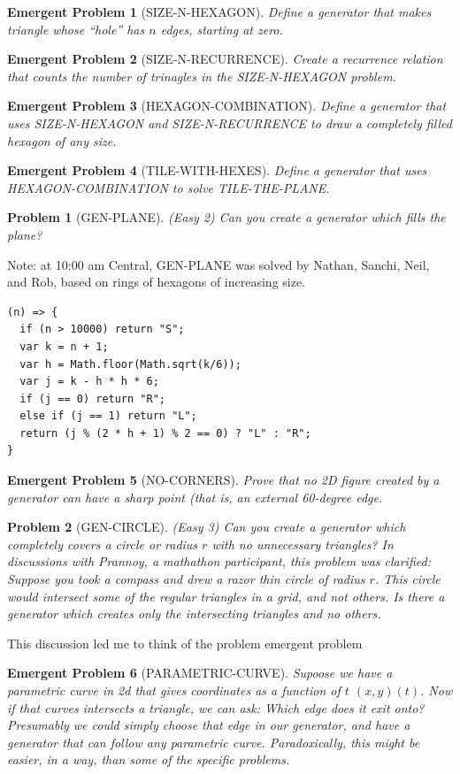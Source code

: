 \documentclass[11pt]{article}
\newtheorem{problem}{Problem}
\newtheorem{eproblem}{Emergent Problem}
\begin{document}
\begin{eproblem}[SIZE-N-HEXAGON]
  Define a generator that makes triangle whose ``hole'' has $n$ edges, starting at zero.
\end{eproblem}
\begin{eproblem}[SIZE-N-RECURRENCE]
  Create a recurrence relation that counts the number of trinagles in the SIZE-N-HEXAGON problem.
\end{eproblem}
\begin{eproblem}[HEXAGON-COMBINATION]
  Define a generator that uses SIZE-N-HEXAGON and SIZE-N-RECURRENCE to draw a completely filled hexagon of any size.
\end{eproblem}
\begin{eproblem}[TILE-WITH-HEXES]
  Define a generator that uses HEXAGON-COMBINATION to solve TILE-THE-PLANE.
\end{eproblem}

\begin{problem}[GEN-PLANE]
(Easy 2) Can you create a generator which fills the plane?  
\end{problem}

Note: at 10:00 am Central, GEN-PLANE was solved by Nathan, Sanchi, Neil, and Rob, based on rings of hexagons of increasing size.

\begin{verbatim}
(n) => {
  if (n > 10000) return "S"; 
  var k = n + 1;
  var h = Math.floor(Math.sqrt(k/6));
  var j = k - h * h * 6;
  if (j == 0) return "R";
  else if (j == 1) return "L";
  return (j % (2 * h + 1) % 2 == 0) ? "L" : "R";
}
\end{verbatim}

\begin{eproblem}[NO-CORNERS]
  Prove that no 2D figure created by a generator can have a sharp point (that is, an external 60-degree edge.
  \end{eproblem}


\begin{problem}[GEN-CIRCLE]
  (Easy 3) Can you create a generator which completely covers a circle or radius $r$ with no unnecessary triangles?
  In discussions with Prannoy, a mathathon participant, this problem was clarified: Suppose you took a compass and
  drew a razor thin circle of radius $r$. This circle would intersect some of the regular triangles in a grid,
  and not others. Is there a generator which creates only the intersecting triangles and no others.
\end{problem}

This discussion led me to think of the problem emergent problem
\begin{eproblem}[PARAMETRIC-CURVE]
  \label{eprob-parametric-curve}
  Supoose we have a parametric curve in 2d that gives coordinates as a function of $t$ $(x,y)(t)$.
  Now if that curves intersects a triangle, we can ask: Which edge does it exit onto? Presumably we could
  simply choose that edge in our generator, and have a generator that can follow any parametric curve.
  Paradoxically, this might be easier, in a way, than some of the specific problems.
\end{eproblem}
\end{document}
